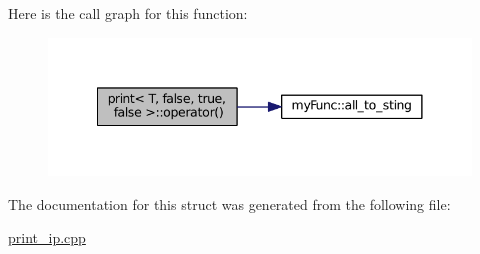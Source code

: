 Here is the call graph for this function\+:
\nopagebreak
\begin{figure}[H]
\begin{center}
\leavevmode
\includegraphics[width=341pt]{structprint_3_01T_00_01false_00_01true_00_01false_01_4_a00a0c1a4bc754bbe723e38bfaa6e8827_cgraph}
\end{center}
\end{figure}




The documentation for this struct was generated from the following file\+:\begin{DoxyCompactItemize}
\item 
\hyperlink{print__ip_8cpp}{print\+\_\+ip.\+cpp}\end{DoxyCompactItemize}
